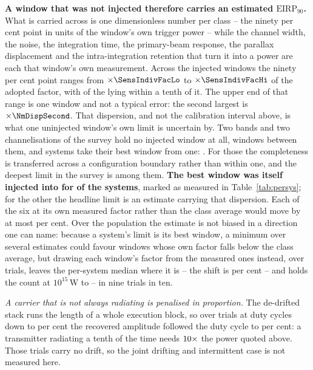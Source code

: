 \textbf{A window that was not injected therefore carries an estimated
$\mathrm{EIRP}_{90}$.} What is carried across is one dimensionless number per
class -- the ninety per cent point in units of the window's own trigger power
-- while the channel width, the noise, the integration time, the primary-beam
response, the parallax displacement and the intra-integration retention that
turn it into a power are each that window's own measurement.
Across the injected windows the ninety per cent point
ranges from $\times\SensIndivFacLo$ to $\times\SensIndivFacHi$ of the
adopted factor, with \NmDispNTenth{} of the \SensNInj{} lying within a tenth
of it. The upper end of that range is one window and not a typical error: the
second largest is $\times\NmDispSecond$. That dispersion, and not the calibration
interval above, is what one uninjected window's own limit is uncertain by.
Two bands and two channelisations of the survey hold no injected window at
all, \NgNExtrapWin{} windows between them, and \NgNExtrapSys{} systems take
their best window from one: \NgExtrapSys. For those the completeness is
transferred across a configuration boundary rather than within one, and the
deepest limit in the survey is among them.
\textbf{The best window was itself injected into for \SmcNMeasSys{} of the
\NSysClassA{} systems}, marked as measured in Table~\ref{tab:persys}; for the
other \SmcNEstSys{} the headline limit is an estimate carrying that
dispersion. Each of the six at its own measured
factor rather than the class average would move by at most \NmOwnDevPct{} per
cent. Over the population the estimate is not biased in a direction one can
name: because a system's limit is its best window, a minimum over several
estimates could favour windows whose own factor falls below the class
average, but drawing each window's factor from the \SensNInj{} measured ones
instead, over \ScRsNTrial{} trials, leaves the per-system median where it
is -- the shift is \ScRsMedShiftPct{} per cent -- and holds the count at
$10^{15}$\,W to \ScRsNLo--\ScRsNHi{} in nine trials in ten.

\emph{A carrier that is not always radiating is penalised in proportion.} The
de-drifted stack runs the length of a whole execution block, so over
\DutyNTrial{} trials at duty cycles down to \DutyCycleMinPct{} per cent the
recovered amplitude followed the duty cycle to \DutyAttenDevPct{} per cent: a
transmitter radiating a tenth of the time needs $10\times$ the power
quoted above. Those trials carry no drift, so the joint drifting and
intermittent case is not measured here.

